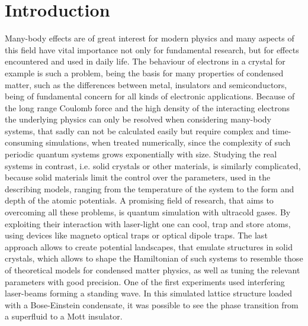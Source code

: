 \chapter{Introduction}

Many-body effects are of great interest for modern physics and many aspects of this field have vital importance not only for fundamental research, but for effects encountered and used in daily life. The behaviour of electrons in a crystal for example is such a problem, being the basis for many properties of condensed matter, such as the differences between metal, insulators and semiconductors, being of fundamental concern for all kinds of electronic applications. Because of the long range Coulomb force and the high density of the interacting electrons the underlying physics can only be resolved when considering many-body systems, that sadly can not be calculated easily but require complex and time-consuming simulations, when treated numerically, since the complexity of such periodic quantum systems grows exponentially with size\cite{feynman}. Studying the real systems in contrast, i.e. solid crystals or other materials, is similarly complicated, because solid materials limit the control over the parameters, used in the describing models, ranging from the temperature of the system to the form and depth of the atomic potentials. A promising field of research, that aims to overcoming all these problems, is quantum simulation with ultracold gases. By exploiting their interaction with laser-light one can cool, trap and store atoms, using devices like magneto optical traps or optical dipole traps\cite{metcalf}. The last approach allows to create potential landscapes, that emulate structures in solid crystals, which allows to shape the Hamiltonian of such systems to resemble those of theoretical models for condensed matter physics, as well as tuning the relevant parameters with good precision\cite{bloch}. One of the first experiments used interfering laser-beams forming a standing wave. In this simulated lattice structure loaded with a Bose-Einstein condensate, it was possible to see the phase transition from a superfluid to a Mott insulator\cite{greiner}.

